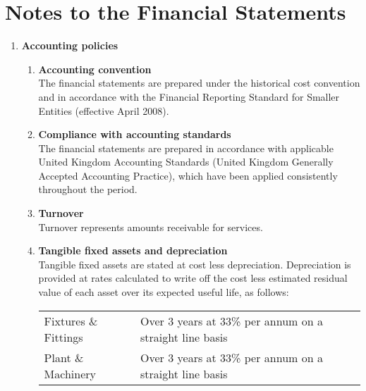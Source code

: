 \section {Notes to the Financial Statements}
\begin{enumerate}
    \item {\bf Accounting policies}
    \begin{enumerate}
        \item {\bf Accounting convention} \\
                The financial statements are prepared under the 
            historical cost convention and in accordance with the Financial Reporting 
            Standard for Smaller Entities (effective April 2008).
        \item {\bf Compliance with accounting standards} \\
            The financial statements are prepared in accordance with applicable United
            Kingdom Accounting Standards (United Kingdom Generally Accepted Accounting
            Practice), which have been applied consistently throughout the period.
        \item {\bf Turnover} \\
            Turnover represents amounts receivable for services.
        \item {\bf Tangible fixed assets and depreciation} \\
            Tangible fixed assets are stated at cost less depreciation. Depreciation is
            provided at rates calculated to write off the cost less estimated residual
            value of each asset over its expected useful life, as follows: \\[6pt]
            \begin{tabular}{  l  p{6.5cm} }
                \toprule
                Fixtures \& Fittings & Over 3 years at 33\% per annum on a straight line basis \\
                Plant \& Machinery & Over 3 years at 33\% per annum on a straight line basis \\
                \bottomrule
            \end{tabular}
    \end{enumerate}
\end{enumerate}
